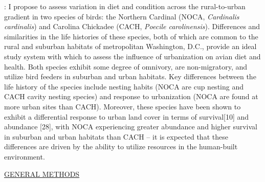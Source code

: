 \documentclass[12pt]{article}
\begin{document}

: I propose to assess variation in diet and condition across the rural-to-urban gradient in two species of birds: the Northern Cardinal (NOCA, \textit{Cardinalis cardinalis}) and Carolina Chickadee (CACH, \textit{Poecile carolinensis}). Differences and similarities in the life histories of these species, both of which are common to the rural and suburban habitats of metropolitan Washington, D.C., provide an ideal study system with which to assess the influence of urbanization on avian diet and health. Both species exhibit some degree of omnivory, are non-migratory, and utilize bird feeders in suburban and urban habitats. Key differences between the life history of the species include nesting habits (NOCA are cup nesting and CACH cavity nesting species) and response to urbanization (NOCA are found at more urban sites than CACH). Moreover, these species have been shown to exhibit a differential response to urban land cover in terms of survival[10] and abundance [28], with NOCA experiencing greater abundance and higher survival in suburban and urban habitats than CACH -- it is expected that these differences are driven by the ability to utilize resources in the human-built environment.


\noindent \underline{GENERAL METHODS}\par
\end{document}
